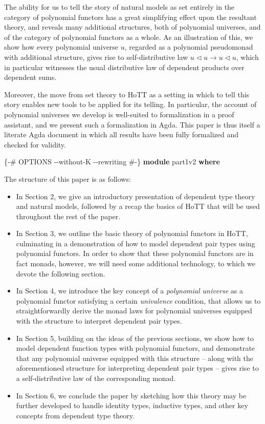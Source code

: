 \documentclass[
  11pt,
  oneside,
  article]{memoir}
\newenvironment{Shaded}{}{}
\newcommand{\KeywordTok}[1]{\textcolor[rgb]{0.00,0.44,0.13}{\textbf{#1}}}
\newcommand{\NormalTok}[1]{#1}
\newcommand{\PreprocessorTok}[1]{\textcolor[rgb]{0.74,0.48,0.00}{#1}}
\providecommand{\tightlist}{%
  \setlength{\itemsep}{0pt}\setlength{\parskip}{0pt}}
\theoremstyle{definition}
\theoremstyle{plain}
\newcommand{\0}{\textsf{0}}
\newcommand{\1}{\tn{\textsf{1}}}
\newcommand{\tri}{\mathbin{\triangleleft}}
\begin{document}
The ability for us to tell the story of natural models as set entirely
in the category of polynomial functors has a great simplifying effect
upon the resultant theory, and reveals many additional structures, both
of polynomial universes, and of the category of polynomial functors as a
whole. As an illustration of this, we show how every polynomial universe
\(u\), regarded as a polynomial pseudomonad with additional structure,
gives rise to self-distributive law \(u\tri u\to u\tri u\), which in
particular witnesses the usual distributive law of dependent products
over dependent sums.

Moreover, the move from set theory to HoTT as a setting in which to tell
this story enables new tools to be applied for its telling. In
particular, the account of polynomial universes we develop is
well-suited to formalization in a proof assistant, and we present such a
formalization in Agda. This paper is thus itself a literate Agda
document in which all results have been fully formalized and checked for
validity.

\begin{Shaded}
\begin{Highlighting}[]
\PreprocessorTok{\{{-}\# OPTIONS {-}{-}without{-}K {-}{-}rewriting \#{-}\}}
\KeywordTok{module}\NormalTok{ part1v2 }\KeywordTok{where}
\end{Highlighting}
\end{Shaded}

The structure of this paper is as follows:

\begin{itemize}
\tightlist
\item
  In Section 2, we give an introductory presentation of dependent type
  theory and natural models, followed by a recap the basics of HoTT that
  will be used throughout the rest of the paper.
\item
  In Section 3, we outline the basic theory of polynomial functors in
  HoTT, culminating in a demonstration of how to model dependent pair
  types using polynomial functors. In order to show that these
  polynomial functors are in fact monads, however, we will need some
  additional technology, to which we devote the following section.
\item
  In Section 4, we introduce the key concept of a \emph{polynomial
  universe} as a polynomial functor satisfying a certain
  \emph{univalence} condition, that allows us to straightforwardly
  derive the monad laws for polynomial universes equipped with the
  structure to interpret dependent pair types.
\item
  In Section 5, building on the ideas of the previous sections, we show
  how to model dependent function types with polynomial functors, and
  demonstrate that any polynomial universe equipped with this structure
  -- along with the aforementioned structure for interpreting dependent
  pair types -- gives rise to a self-distributive law of the
  corresponding monad.
\item
  In Section 6, we conclude the paper by sketching how this theory may
  be further developed to handle identity types, inductive types, and
  other key concepts from dependent type theory.
\end{itemize}
\end{document}
